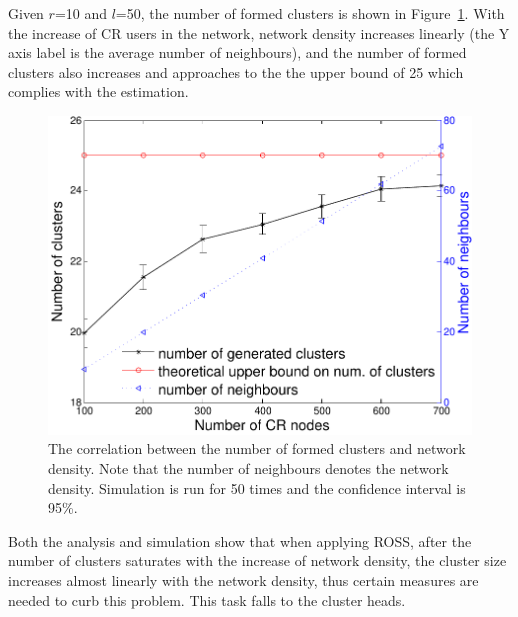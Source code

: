 \documentclass[10pt,journal,compsoc]{IEEEtran}
\theoremstyle{mytheoremstyle}
\theoremstyle{mytheoremstyle}
\theoremstyle{mytheoremstyle}
\begin{document}
Given $r$=10 and $l$=50, the number of formed clusters is shown in Figure~\ref{number_clusters_scale}.
With the increase of CR users in the network, network density increases linearly (the Y axis label is the average number of neighbours), and the number of formed clusters also increases and approaches to the the upper bound of 25 which complies with the estimation.


\begin{figure}[h]
  \centering
  \includegraphics[width=0.8\linewidth]{number_clusters_upperBound.pdf}
  \caption{The correlation between the number of formed clusters and network density. Note that the number of neighbours denotes the network density. Simulation is run for 50 times and the confidence interval is 95\%.}
  \label{number_clusters_scale}
\end{figure}

Both the analysis and simulation show that when applying ROSS, after the number of clusters saturates with the increase of network density, the cluster size increases almost linearly with the network density, thus certain measures are needed to curb this problem.
This task falls to the cluster heads.
\end{document}
